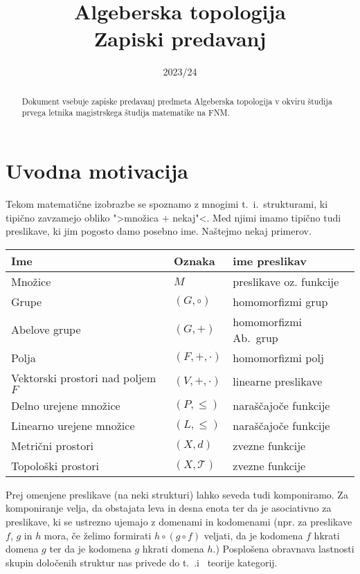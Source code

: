 \documentclass[a4paper, 10pt]{article}
\title{Algeberska topologija\\ Zapiski predavanj}
\date{2023/24}
\begin{document}
	\maketitle
	\newpage
	\begin{abstract}
		\noindent Dokument vsebuje zapiske predavanj predmeta Algeberska topologija v okviru študija prvega letnika magistrskega študija matematike na FNM.
	\end{abstract}
	\tableofcontents
	\newpage
	\section{Uvodna motivacija}
	Tekom matematične izobrazbe se spoznamo z mnogimi t.~i.~strukturami, ki tipično zavzamejo obliko ">množica $+$ nekaj"<. Med njimi imamo tipično tudi preslikave, ki jim pogosto damo posebno ime. Naštejmo nekaj primerov.
	\begin{table}[h!]
		\centering
		\begin{tabular}{|l|l|l|}
			Ime & Oznaka & ime preslikav \\\hline
			Množice & $M$ & preslikave oz. funkcije \\\hline
			Grupe & $(G, \circ)$ & homomorfizmi grup \\\hline
			Abelove grupe & $(G, +)$ & homomorfizmi Ab.~grup \\\hline
			Polja & $(F, +, \cdot)$ & homomorfizmi polj \\\hline
			Vektorski prostori nad poljem $F$ & $(V, +, \cdot)$ & linearne preslikave \\\hline
			Delno urejene množice & $(P, \leq)$ & naraščajoče funkcije \\\hline
			Linearno urejene množice & $(L, \leq)$ & naraščajoče funkcije \\\hline
			Metrični prostori & $(X, d)$ & zvezne funkcije \\\hline
			Topološki prostori & $(X, \mathcal{T})$ & zvezne funkcije \\\hline
		\end{tabular}
	\end{table}
	Prej omenjene preslikave (na neki strukturi) lahko seveda tudi komponiramo. Za komponiranje velja, da obstajata leva in desna enota ter da je asociativno za preslikave, ki se ustrezno ujemajo z domenami in kodomenami (npr. za preslikave $f$, $g$ in $h$ mora, če želimo formirati $h\circ (g \circ f)$ veljati, da je kodomena $f$ hkrati domena $g$ ter da je kodomena $g$ hkrati domena $h$.)
	Posplošena obravnava lastnosti skupin določenih struktur nas privede do t.~.i~ teorije kategorij.
	
\end{document}
